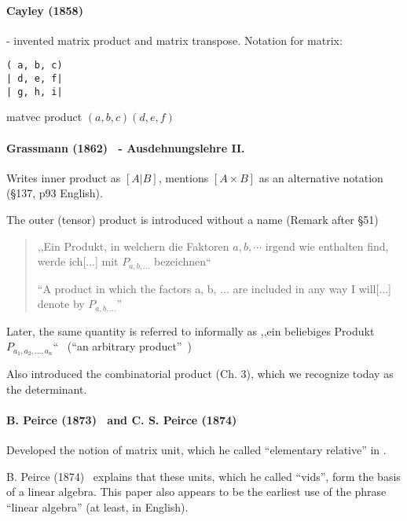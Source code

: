 \paragraph{Cayley (1858)~\cite{Cayley1858}} - invented matrix product and matrix transpose.
Notation for matrix:
\begin{verbatim}
( a, b, c)
| d, e, f|
| g, h, i|
\end{verbatim}

matvec product $(a, b, c)\!\!(d, e, f)$


\paragraph{Grassmann (1862)~\cite{Grassmann1862,Grassmann2000} - Ausdehnungslehre II.}

Writes inner product as $[A | B]$, mentions $[A \times B]$ as an alternative notation (\S 137, p93 English).

The outer (tensor) product is introduced without a name (Remark after \S 51)

\begin{quote}
,,Ein Produkt, in welchern die Faktoren $a, b, \cdots$ irgend wie enthalten find, werde ich[...] mit $P_{a,b,...}$ bezeichnen`` \cite[p. 24, \S 43]{Grassmann1862}

``A product in which the factors a, b, ... are included in any way I will[...] denote by $P_{a,b,...}$''~\cite[p. 22, \S 43]{Grassmann2000}
\end{quote}

Later, the same quantity is referred to informally as
,,ein beliebiges Produkt $P_{a_1, a_2, ..., a_n}$``~\cite[\S 353]{Grassmann1862} (``an arbitrary product''~\cite[p. 196, \S 353]{Grassmann2000})

Also introduced the combinatorial product (Ch. 3), which we recognize today as the determinant.


\paragraph{B. Peirce (1873)~\cite{Peirce1873} and C. S. Peirce (1874)~\cite{Peirce1874}}

Developed the notion of matrix unit, which he called ``elementary relative'' in \cite[p.359]{Peirce1873}.

B. Peirce (1874)~\cite{Peirce1874} explains that these units, which he called ``vids'', form the basis of a linear algebra. This paper also appears to be the earliest use of the phrase ``linear algebra'' (at least, in English).

